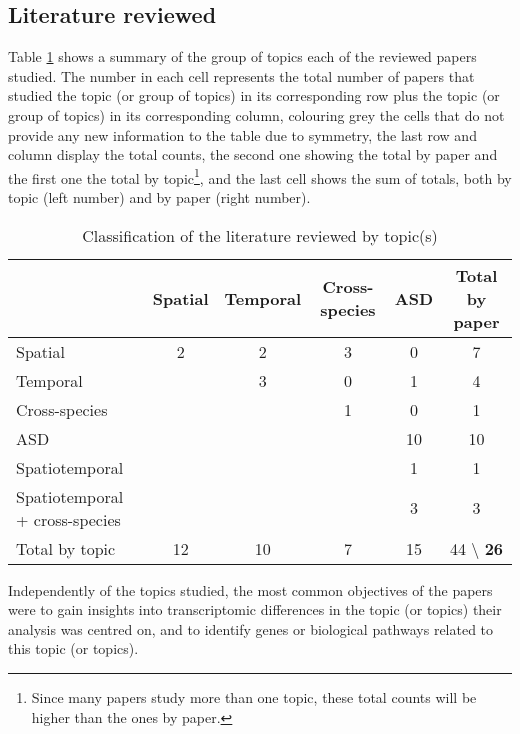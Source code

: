 \subsection{Literature reviewed}\label{Literature}

Table \ref{table:LiteratureByTopic} shows a summary of the group of topics each of the reviewed papers studied. The number in each cell represents the total number of papers that studied the topic (or group of topics) in its corresponding row plus the topic (or group of topics) in its corresponding column, colouring grey the cells that do not provide any new information to the table due to symmetry, the last row and column display the total counts, the second one showing the total by paper and the first one the total by topic\footnote{Since many papers study more than one topic, these total counts will be higher than the ones by paper.}, and the last cell shows the sum of totals, both by topic (left number) and by paper (right number).

\begin{table}[ht]
\renewcommand{\arraystretch}{1.5}
    \centering
    \begin{tabular}{ l | c c c c | c }
                    & Spatial & Temporal & Cross-species & ASD & Total by paper \\
    \hline
    Spatial         & 2                  & 2                  & 3                  & 0  & 7  \\
    Temporal        & \cellcolor{l-grey} & 3                  & 0                  & 1  & 4  \\
    Cross-species   & \cellcolor{l-grey} & \cellcolor{l-grey} & 1                  & 0  & 1  \\
    ASD             & \cellcolor{l-grey} & \cellcolor{l-grey} & \cellcolor{l-grey} & 10 & 10 \\
    Spatiotemporal  & \cellcolor{l-grey} & \cellcolor{l-grey} & \cellcolor{l-grey} & 1  & 1  \\
    Spatiotemporal + 
    cross-species   & \cellcolor{l-grey} & \cellcolor{l-grey} & \cellcolor{l-grey} & 3  & 3  \\
    \hline
    Total by topic  & 12 & 10 & 7 & 15 & 44 \textbackslash{} \textbf{26} \\
    \end{tabular}
    \caption{Classification of the literature reviewed by topic(s)}
    \label{table:LiteratureByTopic}
\end{table}

Independently of the topics studied, the most common objectives of the papers were to gain insights into transcriptomic differences in the topic (or topics) their analysis was centred on, and to identify genes or biological pathways related to this topic (or topics).
